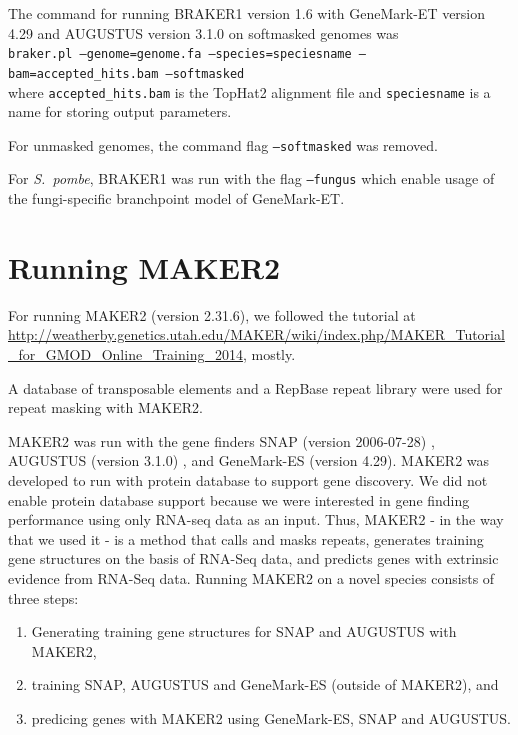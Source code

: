 \documentclass[a4paper,10pt]{report}
\begin{document}
The command for running BRAKER1 version 1.6 with GeneMark-ET version 4.29 and AUGUSTUS version 3.1.0 on softmasked genomes was\\

\noindent \texttt{braker.pl --genome=genome.fa --species=speciesname --bam=accepted\_hits.bam --softmasked}\\

\noindent where \texttt{accepted\_hits.bam} is the TopHat2 alignment file and \texttt{speciesname} is a name for storing output parameters.

\noindent For unmasked genomes, the command flag \texttt{--softmasked} was removed.

\noindent For \textit{S.~pombe}, BRAKER1 was run with the flag \texttt{--fungus} which enable usage of the fungi-specific branchpoint model of GeneMark-ET.

\section{Running MAKER2}

For running MAKER2 (version 2.31.6), we followed the tutorial at \url{http://weatherby.genetics.utah.edu/MAKER/wiki/index.php/MAKER_Tutorial_for_GMOD_Online_Training_2014}, mostly.

A database of transposable elements and a RepBase repeat library were used for repeat masking with MAKER2.

MAKER2 was run with the gene finders SNAP (version 2006-07-28) \cite{SNAP}, AUGUSTUS (version 3.1.0) \cite{AUGUSTUS}, and GeneMark-ES \cite{GeneMark-ES} (version 4.29). MAKER2 was developed to run with protein database to support gene discovery. We did not enable protein database support because we were interested in gene finding performance using only RNA-seq data as an input. Thus, MAKER2 - in the way that we used it - is a method that calls and masks repeats, generates training gene structures on the basis of RNA-Seq data, and predicts genes with extrinsic evidence from RNA-Seq data. Running MAKER2 on a novel species consists of three steps: 

\begin{enumerate}
 \item Generating training gene structures for SNAP and AUGUSTUS with MAKER2,
 \item training SNAP, AUGUSTUS and GeneMark-ES (outside of MAKER2), and
 \item predicing genes with MAKER2 using GeneMark-ES, SNAP and AUGUSTUS.
\end{enumerate}
\end{document}
